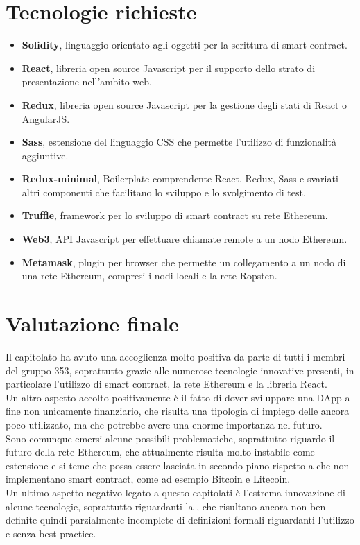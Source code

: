 \documentclass[StudioDiFattibilità.tex]{subfiles}
\begin{document}
\section{Tecnologie richieste}
\begin{itemize}
	\item \textbf{Solidity}, linguaggio orientato agli oggetti per la scrittura di smart contract.
	\item \textbf{React}, libreria open source Javascript per il supporto dello strato di presentazione nell'ambito web.
	\item \textbf{Redux}, libreria open source Javascript per la gestione degli stati di React o AngularJS.
	\item \textbf{Sass}, estensione del linguaggio CSS che permette l'utilizzo di funzionalità aggiuntive.
	\item \textbf{Redux-minimal}, Boilerplate comprendente React, Redux, Sass e svariati altri componenti che facilitano lo sviluppo e lo svolgimento di test.
	\item \textbf{Truffle}, framework per lo sviluppo di smart contract su rete Ethereum.
	\item \textbf{Web3}, API Javascript per effettuare chiamate remote a un nodo Ethereum.
	\item \textbf{Metamask}, plugin per browser che permette un collegamento a un nodo di una rete Ethereum, compresi i nodi locali e la rete Ropsten.
\end{itemize}
\section{Valutazione finale}
Il capitolato ha avuto una accoglienza molto positiva da parte di tutti i membri del gruppo 353, soprattutto grazie alle numerose tecnologie innovative presenti, in particolare l'utilizzo di smart contract, la rete Ethereum e la libreria React.\\
Un altro aspetto accolto positivamente è il fatto di dover sviluppare una DApp a fine non unicamente finanziario, che risulta una tipologia di impiego delle  ancora poco utilizzato, ma che potrebbe avere una enorme importanza nel futuro.\\
Sono comunque emersi alcune possibili problematiche, soprattutto riguardo il futuro della rete Ethereum, che attualmente risulta molto instabile come estensione e si teme che possa essere lasciata in secondo piano rispetto a  che non implementano smart contract, come ad esempio Bitcoin e Litecoin.\\
Un ultimo aspetto negativo legato a questo capitolati è l'estrema innovazione di alcune tecnologie, soprattutto riguardanti la , che risultano ancora non ben definite quindi parzialmente incomplete di definizioni formali riguardanti l'utilizzo e senza best practice.
\end{document}

